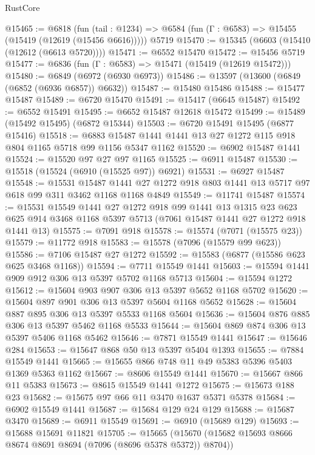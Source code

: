\begin{lexlean}{RustCore}
\begin{coremodule}
@15465 := @6818
    (fun (tail : @1234) => @6584 (fun (Γ : @6583) => @15455 (@15419 (@12619 (@15456 @6616)))))
    @5719
@15470 := @15345 (@6603 (@15410 (@12612 (@6613 @5720))))
@15471 := @6552 @15470
@15472 := @15456 @5719
@15477 := @6836 (fun (Γ : @6583) => @15471 (@15419 (@12619 @15472)))
@15480 := @6849 (@6972 (@6930 @6973))
@15486 := @13597 (@13600 (@6849 (@6852 (@6936 @6857)) @6632))
@15487 := @15480 @15486
@15488 := @15477 @15487
@15489 := @6720 @15470
@15491 := @15417 (@6645 @15487)
@15492 := @6552 @15491
@15495 := @6652 @15487 @12618 @15472
@15499 := @15489 (@15492 @15495) (@6872 @15344)
@15503 := @6720 @15491 @15495 (@6877 @15416)
@15518 := @6883 @15487 @1441 @1441 @13 @27 @1272 @115 @918 @804 @1165 @5718 @99 @1156 @5347 @1162
@15520 := @6902 @15487 @1441
@15524 := @15520 @97 @27 @97 @1165
@15525 := @6911 @15487
@15530 := @15518 (@15524 (@6910 (@15525 @97)) @6921)
@15531 := @6927 @15487
@15548 := @15531
    @15487
    @1441
    @27
    @1272
    @918
    @803
    @1441
    @13
    @5717
    @97
    @618
    @99
    @311
    @3462
    @1168
    @1168
    @4849
@15549 := @11741 @15487
@15574 := @15531
    @15549
    @1441
    @27
    @1272
    @918
    @99
    @1441
    @13
    @1315
    @23
    @623
    @625
    @914
    @3468
    @1168
    @5397
    @5713
    (@7061 @15487 @1441 @27 @1272 @918 @1441 @13)
@15575 := @7091 @918
@15578 := @15574 (@7071 (@15575 @23))
@15579 := @11772 @918
@15583 := @15578 (@7096 (@15579 @99 @623))
@15586 := @7106 @15487 @27 @1272
@15592 := @15583 (@6877 (@15586 @623 @625 @3468 @1168))
@15594 := @7711 @15549 @1441
@15603 := @15594 @1441 @909 @912 @306 @13 @5397 @5702 @1168 @5713
@15604 := @15594 @1272
@15612 := @15604 @903 @907 @306 @13 @5397 @5652 @1168 @5702
@15620 := @15604 @897 @901 @306 @13 @5397 @5604 @1168 @5652
@15628 := @15604 @887 @895 @306 @13 @5397 @5533 @1168 @5604
@15636 := @15604 @876 @885 @306 @13 @5397 @5462 @1168 @5533
@15644 := @15604 @869 @874 @306 @13 @5397 @5406 @1168 @5462
@15646 := @7871 @15549 @1441
@15647 := @15646 @284
@15653 := @15647 @868 @50 @13 @5397 @5404 @1393
@15655 := @7884 @15549 @1441
@15665 := @15655 @866 @748 @11 @49 @5383 @5396 @5403 @1369 @5363 @1162
@15667 := @8606 @15549 @1441
@15670 := @15667 @866 @11 @5383
@15673 := @8615 @15549 @1441 @1272
@15675 := @15673 @188 @23
@15682 := @15675 @97 @66 @11 @3470 @1637 @5371 @5378
@15684 := @6902 @15549 @1441
@15687 := @15684 @129 @24 @129
@15688 := @15687 @3470
@15689 := @6911 @15549
@15691 := @6910 (@15689 @129)
@15693 := @15688 @15691 @11821
@15705 := @15665 (@15670 (@15682 @15693 @8666 @8674 @8691 @8694 (@7096 (@8696 @5378 @5372)) @8704))

\end{coremodule}
\end{lexlean}
